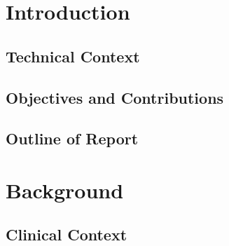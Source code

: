 \documentclass[12pt,twoside]{report}
\begin{document}


\clearpage{\pagestyle{empty}\cleardoublepage}
\setcounter{page}{1}
\pagestyle{fancy}




   
  
\tableofcontents
  


\setcounter{page}{1}
\fancyhead[LE,RO]{\slshape \rightmark}
\fancyhead[LO,RE]{\slshape \leftmark}

\chapter{Introduction}

\section{Technical Context}
\section{Objectives and Contributions}
\section{Outline of Report}

\chapter{Background}

\section{Clinical Context}
\end{document}
